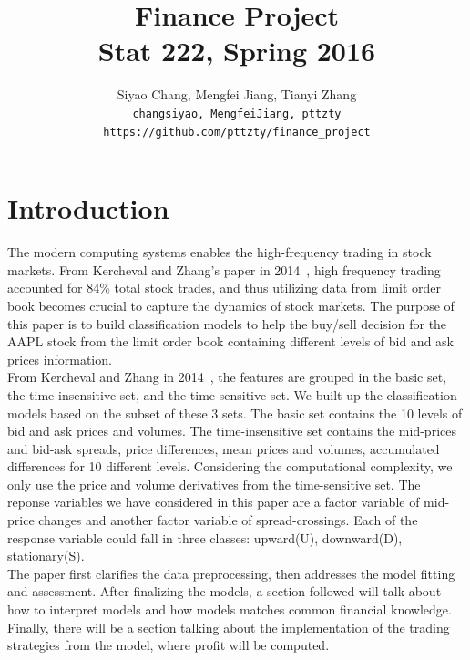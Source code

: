 \documentclass[11pt]{article}
\title{Finance Project\\
  Stat 222, Spring 2016}
\author{
  Siyao Chang, Mengfei Jiang, Tianyi Zhang\\
  \texttt{changsiyao, MengfeiJiang, pttzty} \\
  \texttt{https://github.com/pttzty/finance\_project}
}
\begin{document}
\maketitle



\section{Introduction}
The modern computing systems enables the high-frequency trading in stock markets. From Kercheval and Zhang's paper in 2014~\cite{financesvm}, high frequency trading accounted for 84\% total stock trades, and thus utilizing data from limit order book becomes crucial to capture the dynamics of stock markets. The purpose of this paper is to build classification models to help the buy/sell decision for the AAPL stock from the limit order book containing different levels of bid and ask prices information.\\
From Kercheval and Zhang in 2014~\cite{financesvm}, the features are grouped in the basic set, the time-insensitive set, and the time-sensitive set. We built up the classification models based on the subset of these 3 sets. The basic set contains the 10 levels of bid and ask prices and volumes. The time-insensitive set contains the mid-prices and bid-ask spreads, price differences, mean prices and volumes, accumulated differences for 10 different levels. Considering the computational complexity, we only use the price and volume derivatives from the time-sensitive set. The reponse variables we have considered in this paper are a factor variable of mid-price changes and another factor variable of spread-crossings. Each of the response variable could fall in three classes: upward(U), downward(D), stationary(S).\\
The paper first clarifies the data preprocessing, then addresses the model fitting and assessment. After finalizing the models, a section followed will talk about how to interpret models and how models matches common financial knowledge. Finally, there will be a section talking about the implementation of the trading strategies from the model, where profit will be computed.
\end{document}
